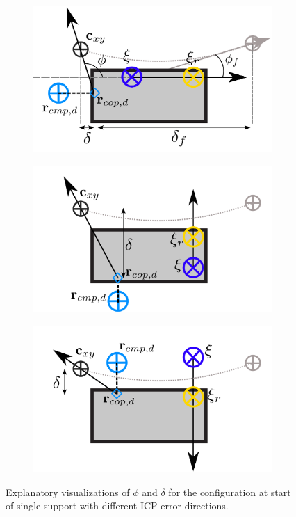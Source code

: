 \begin{figure}[h]
\begin{subfigure}{0.49\textwidth}
    \centering
  \includegraphics[width=.7\linewidth]{STYLESTUFF/ICPplanStartSSPhiViz.png}
  \caption{}
   \label{fig:phiVizb}
  \end{subfigure}
    \begin{subfigure}{0.49\textwidth}
    \centering
  \includegraphics[width=.7\linewidth]{STYLESTUFF/ICPplanStartSSPhiVizLeftError.png}
    \caption{}
     \label{fig:phiVize}
  \end{subfigure}
  \begin{subfigure}{0.49\textwidth}
    \centering
  \includegraphics[width=.7\linewidth]{STYLESTUFF/ICPplanStartSSPhiVizRightError.png}
    \caption{}
     \label{fig:phiVizf}
  \end{subfigure}
  \caption{Explanatory visualizations of $\phi$ and $\delta$ for the configuration at start of single support with different \ac{ICP} error directions.}
  \label{fig:phiViz}
\end{figure}

